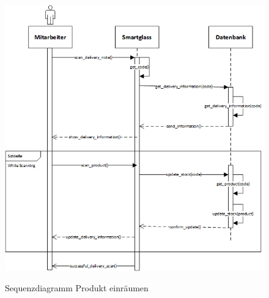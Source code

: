 \begin{figure}[H]
	\centering
	{\includegraphics[scale=1.0]{Bilder/Abbildungen/SMAR_warenannahme_Sequenzdiagramm.png}}
	\caption{Sequenzdiagramm Produkt einräumen}
	\label{fig:sequenz_warenannnahme}
\end{figure}

